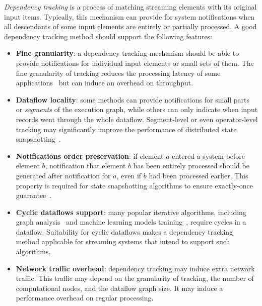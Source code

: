 {\em Dependency tracking} is a process of matching streaming elements with its original input items. Typically, this mechanism can provide for system notifications when all descendants of some input elements are entirely or partially processed. A good dependency tracking method should support the following features:
\begin{itemize}
    \item {\bf Fine granularity}: a dependency tracking mechanism should be able to provide notifications for individual input elements or small sets of them. The fine granularity of tracking reduces the processing latency of some applications~\cite{we2018adbis} but can induce an overhead on throughput.
    \item {\bf Dataflow locality}: some methods can provide notifications for small parts or {\em segments} of the execution graph, while others can only indicate when input records went through the whole dataflow. Segment-level or even operator-level tracking may significantly improve the performance of distributed state snapshotting~\cite{Carbone:2017:SMA:3137765.3137777, 2015arXiv150608603C}.
    \item {\bf Notifications order preservation}: if element $a$ entered a system before element $b$, notification that element $b$ has been entirely processed should be generated after notification for $a$, even if $b$ had been processed earlier. This property is required for state snapshotting algorithms to ensure exactly-once guarantee~\cite{2015arXiv150608603C}.
    \item {\bf Cyclic dataflows support}: many popular iterative algorithms, including graph analysis~\cite{xu2016efficient} and machine learning models training~\cite{morales2015samoa}, require cycles in a dataflow. Suitability for cyclic dataflows makes a dependency tracking method applicable for streaming systems that intend to support such algorithms.
    \item {\bf Network traffic overhead}: dependency tracking may induce extra network traffic. This traffic may depend on the granularity of tracking, the number of computational nodes, and the dataflow graph size. It may induce a performance overhead on regular processing.
\end{itemize}

